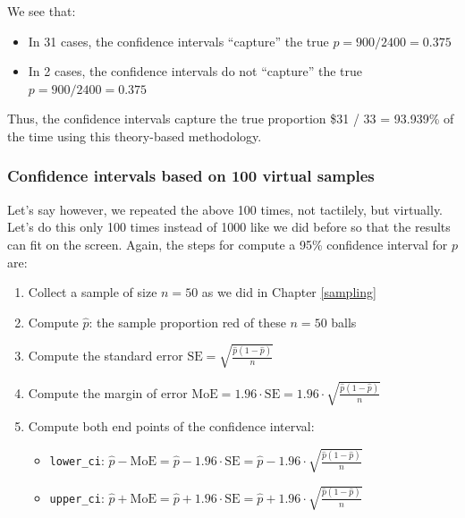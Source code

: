 \documentclass[12pt, krantz2,]{krantz}
\providecommand{\tightlist}{%
  \setlength{\itemsep}{0pt}\setlength{\parskip}{0pt}}
\begin{document}
We see that:

\begin{itemize}
\tightlist
\item
  In 31 cases, the confidence intervals ``capture'' the true \(p = 900 / 2400 = 0.375\)
\item
  In 2 cases, the confidence intervals do not ``capture'' the true \(p = 900 / 2400 = 0.375\)
\end{itemize}

Thus, the confidence intervals capture the true proportion \$31 / 33 = 93.939\% of the time using this theory-based methodology.

\hypertarget{confidence-intervals-based-on-100-virtual-samples}{%
\subsubsection*{Confidence intervals based on 100 virtual samples}\label{confidence-intervals-based-on-100-virtual-samples}}


Let's say however, we repeated the above 100 times, not tactilely, but virtually. Let's do this only 100 times instead of 1000 like we did before so that the results can fit on the screen. Again, the steps for compute a 95\% confidence interval for \(p\) are:

\begin{enumerate}
\def\labelenumi{\arabic{enumi}.}
\tightlist
\item
  Collect a sample of size \(n = 50\) as we did in Chapter \ref{sampling}
\item
  Compute \(\widehat{p}\): the sample proportion red of these \(n=50\) balls
\item
  Compute the standard error \(\text{SE} = \sqrt{\frac{\widehat{p}(1-\widehat{p})}{n}}\)
\item
  Compute the margin of error \(\text{MoE} = 1.96 \cdot \text{SE} = 1.96 \cdot \sqrt{\frac{\widehat{p}(1-\widehat{p})}{n}}\)
\item
  Compute both end points of the confidence interval:

  \begin{itemize}
  \tightlist
  \item
    \texttt{lower\_ci}: \(\widehat{p} - \text{MoE} = \widehat{p} - 1.96 \cdot \text{SE} = \widehat{p} - 1.96 \cdot \sqrt{\frac{\widehat{p}(1-\widehat{p})}{n}}\)
  \item
    \texttt{upper\_ci}: \(\widehat{p} + \text{MoE} = \widehat{p} + 1.96 \cdot \text{SE} = \widehat{p} +1.96 \cdot \sqrt{\frac{\widehat{p}(1-\widehat{p})}{n}}\)
  \end{itemize}
\end{enumerate}
\end{document}
